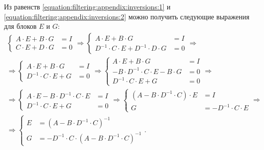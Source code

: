 Из равенств \eqref{equation:filtering:appendix:inversions:1} и \eqref{equation:filtering:appendix:inversions:2} можно получить следующие выражения
для блоков $E$ и $G$:
\begin{gather*}
	\left \{
	\begin{array}{cl}
		A \cdot E + B \cdot G & = I \\
		C \cdot E + D \cdot G & = 0
	\end{array}
	\right .
	\Rightarrow
	\left \{
	\begin{array}{cl}
		A \cdot E + B \cdot G               & = I \\
		D^{-1} \cdot C \cdot E + D^{-1} \cdot D \cdot G & = 0
	\end{array}
	\right .
	\Rightarrow \\
	\Rightarrow
	\left \{
	\begin{array}{cl}
		A \cdot E + B \cdot G & = I \\
		D^{-1} \cdot C \cdot E + G  & = 0
	\end{array}
	\right .
	\Rightarrow
	\left \{
	\begin{array}{cl}
		A \cdot E + B \cdot G & = I \\
		-B \cdot D^{-1} \cdot C \cdot E - B \cdot G  & = 0 \\
		D^{-1} \cdot C \cdot E + G  & = 0
	\end{array}
	\right .
	\Rightarrow \\
	\Rightarrow
	\left \{
	\begin{array}{cl}
		A \cdot E - B \cdot D^{-1} \cdot C \cdot E & = I \\
		D^{-1} \cdot C \cdot E + G  & = 0
	\end{array}
	\right .
	\Rightarrow
	\left \{
	\begin{array}{cl}
		\left ( A - B \cdot D^{-1} \cdot C \right ) \cdot E & = I \\
		G  & = - D^{-1} \cdot C \cdot E
	\end{array}
	\right .
	\Rightarrow \\
	\Rightarrow
	\left \{
	\begin{array}{cl}
		E & = \left ( A - B \cdot D^{-1} \cdot C \right )^{-1} \\
		G  & = - D^{-1} \cdot C \cdot \left ( A - B \cdot D^{-1} \cdot C \right )^{-1}
	\end{array}
	\right .
	.
\end{gather*}

